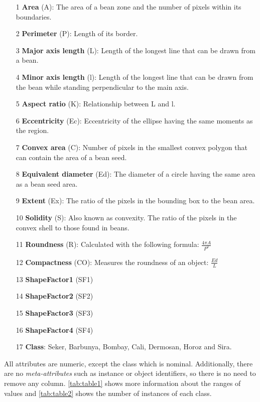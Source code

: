 \documentclass[a4paper,11pt]{article}
\begin{document}
\begin{itemize}
\setlength\itemsep{-1ex}
\item[1] \textbf{Area} (A): The area of a bean zone and the number of pixels within its boundaries.
\item[2] \textbf{Perimeter} (P): Length of its border.
\item[3] \textbf{Major axis length} (L): Length of the longest line that can be drawn from a bean.
\item[4] \textbf{Minor axis length} (l): Length of the longest line that can be drawn from the bean while standing perpendicular to the main axis.
\item[5] \textbf{Aspect ratio} (K): Relationship between L and l.
\item[6] \textbf{Eccentricity} (Ec): Eccentricity of the ellipse having the same moments as the region.
\item[7] \textbf{Convex area} (C): Number of pixels in the smallest convex polygon that can contain the area of a bean seed.
\item[8] \textbf{Equivalent diameter} (Ed): The diameter of a circle having the same area as a bean seed area.
\item[9] \textbf{Extent} (Ex): The ratio of the pixels in the bounding box to the bean area.
\item[10] \textbf{Solidity} (S): Also known as convexity. The ratio of the pixels in the convex shell to those found in beans.
\item[11] \textbf{Roundness} (R): Calculated with the following formula: $\frac{4\pi A}{P^2}$
\item[12] \textbf{Compactness} (CO): Measures the roundness of an object: $\frac{Ed}{L}$
\item[13] \textbf{ShapeFactor1} (SF1)
\item[14] \textbf{ShapeFactor2} (SF2)
\item[15] \textbf{ShapeFactor3} (SF3)
\item[16] \textbf{ShapeFactor4} (SF4)
\item[17] \textbf{Class}: Seker, Barbunya, Bombay, Cali, Dermosan, Horoz and Sira.
\end{itemize}

All attributes are numeric, except the class which is nominal. Additionally, there are no \textit{meta-attributes} such as instance or object identifiers, so there is no need to remove any column. \autoref{tab:table1} shows more information about the ranges of values and \autoref{tab:table2} shows the number of instances of each class.
\end{document}
